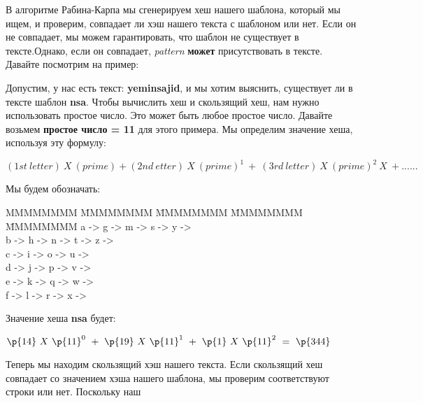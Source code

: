 В алгоритме Рабина-Карпа мы сгенерируем хеш нашего шаблона, который мы ищем, и
проверим, совпадает ли хэш нашего текста с шаблоном или нет. Если он не совпадает, мы
можем гарантировать, что шаблон не существует в тексте.Однако, если он совпадает, \textit{pattern} \textbf{может} присутствовать в тексте. Давайте посмотрим на пример:
\vspace{\baselineskip}

Допустим, у нас есть текст: \textbf{yeminsajid}, и мы хотим выяснить, существует ли в тексте шаблон
\textbf{nsa}. Чтобы вычислить хеш и скользящий хеш, нам нужно использовать простое число. Это
может быть любое простое число. Давайте возьмем \textbf{простое число = 11} для этого примера. Мы
определим значение хеша, используя эту формулу:
\vspace{\baselineskip}
\begin{tcolorbox}
$(1st~letter)~X~(prime)+(2nd~etter)~ X~ (prime)^1~+~(3rd~letter)~ X~ (prime)^2~ X~ + ......$
\end{tcolorbox}
\vspace{\baselineskip}
Мы будем обозначать:
\vspace{\baselineskip}
\begin{tcolorbox}
\begin{tabbing}
MMMMMMMM \= MMMMMMMM \= MMMMMMMM \= MMMMMMMM \= MMMMMMMM \kill
a -> \>g -> \>m -> \>s -> \>y -> \\
b -> \>h -> \>n -> \>t -> \>z -> \\
c -> \>i -> \>o -> \>u -> \\
d -> \>j -> \>p -> \>v -> \\
e -> \>k -> \>q -> \>w -> \\
f -> \>l -> \>r -> \>x -> 
\end{tabbing}
\end{tcolorbox}
\vspace{\baselineskip}
Значение хеша \textbf{nsa} будет:
\vspace{\baselineskip}
\begin{tcolorbox}
$ \p{14}~ X~  \p{11}^0~+~ \p{19}~ X~  \p{11}^1~+~ \p{1}~ X~  \p{11}^2~=~ \p{344}$
\end{tcolorbox}
\vspace{\baselineskip}
Теперь мы находим скользящий хэш нашего текста. Если скользящий хеш совпадает со
значением хэша нашего шаблона, мы проверим соответствуют строки или нет. Поскольку наш
